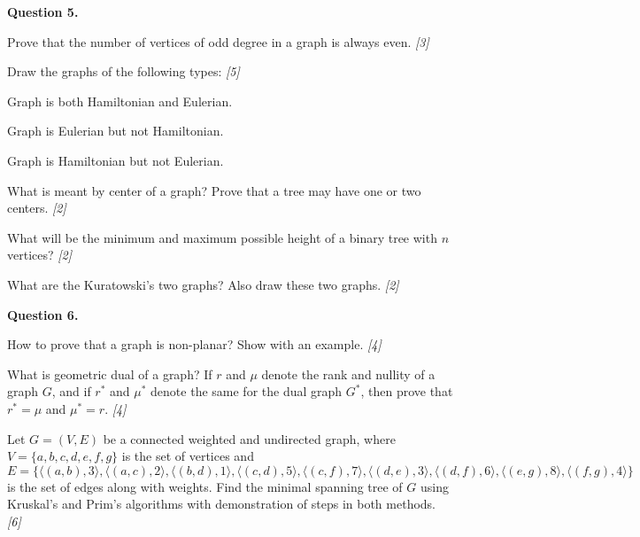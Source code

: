 \documentclass[11pt,a4paper]{article}
\newcommand{\pts}[1]{\hfill   \textit{[#1]}}
\begin{document}
\medskip


\noindent   \textbf{Question 5.}

\begin{parts}
  \item Prove that the number of vertices of odd degree in a graph is always even. \pts{3}
  \item Draw the graphs of the following types: \pts{5}
  
\begin{parts}
    \item Graph is both Hamiltonian and Eulerian.
    \item Graph is Eulerian but not Hamiltonian.
    \item Graph is Hamiltonian but not Eulerian.
  \end{parts}
  \item What is meant by center of a graph? Prove that a tree may have one or two centers. \pts{2}
  \item What will be the minimum and maximum possible height of a binary tree with $n$ vertices? \pts{2}
  \item What are the Kuratowski's two graphs? Also draw these two graphs. \pts{2}
\end{parts}

\medskip


\noindent   \textbf{Question 6.}

\begin{parts}
  \item How to prove that a graph is non-planar? Show with an example. \pts{4}
  \item What is geometric dual of a graph? If $r$ and $\mu$ denote the rank and nullity of a graph $G$, and if $r^*$ and $\mu^*$ denote the same for the dual graph $G^*$, then prove that $r^* = \mu$ and $\mu^* = r$. \pts{4}
  \item Let $G = (V, E)$ be a connected weighted and undirected graph, where $V = \{a, b, c, d, e, f, g\}$ is the set of vertices and
  \[ E = \{\langle (a, b), 3 \rangle, \langle (a, c), 2 \rangle, \langle (b, d), 1 \rangle, \langle (c, d), 5 \rangle, \langle (c, f), 7 \rangle, \langle (d, e), 3 \rangle, \langle (d, f), 6 \rangle, \langle (e, g), 8 \rangle, \langle (f, g), 4 \rangle\} \]
  is the set of edges along with weights. Find the minimal spanning tree of $G$ using Kruskal's and Prim's algorithms with demonstration of steps in both methods. \pts{6}
\end{parts}

\medskip
\end{document}
